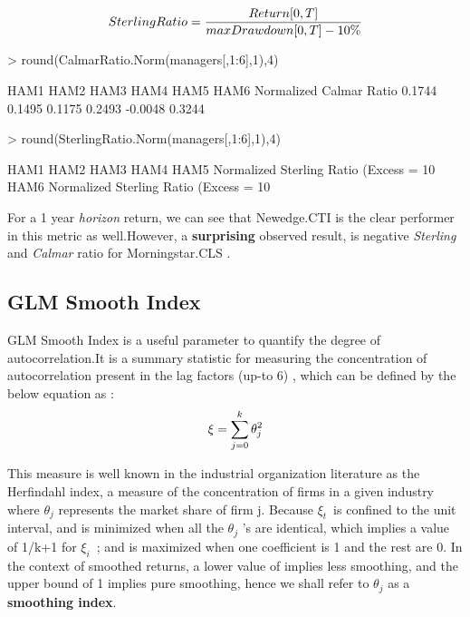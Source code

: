 \documentclass[12pt,letterpaper,english]{article}
\begin{document}
\begin{equation}
 Sterling Ratio  =  \frac{Return [0,T]}{max Drawdown  [0,T] - 10\%} \\
\end{equation}
\begin{Schunk}
\begin{Sinput}
> round(CalmarRatio.Norm(managers[,1:6],1),4)
\end{Sinput}
\begin{Soutput}
                          HAM1   HAM2   HAM3   HAM4    HAM5   HAM6
Normalized Calmar Ratio 0.1744 0.1495 0.1175 0.2493 -0.0048 0.3244
\end{Soutput}
\begin{Sinput}
> round(SterlingRatio.Norm(managers[,1:6],1),4)
\end{Sinput}
\begin{Soutput}
                                           HAM1   HAM2   HAM3  HAM4    HAM5
Normalized Sterling Ratio (Excess = 10%
                                           HAM6
Normalized Sterling Ratio (Excess = 10%
\end{Soutput}
\end{Schunk}
For a 1 year \emph{horizon} return, we can see that Newedge.CTI is the clear performer in this metric as well.However, a \textbf{surprising} observed result, is negative \emph{Sterling} and \emph{Calmar} ratio for Morningstar.CLS . 
\subsection{GLM Smooth Index}
GLM Smooth Index is a useful parameter to quantify the degree of autocorrelation.It is a summary statistic for measuring the concentration of autocorrelation present in the lag factors (up-to 6) , which can be defined by the below equation as :
\begin{equation}
\xi =   \sum_{j=0}^{k} \theta _j^2 \\
\end{equation}

This measure is well known in the industrial organization literature as the Herfindahl index, a measure of the concentration of firms in a given industry where $\theta$\(_j\) represents the market share of firm j. Because $\xi_t$\ is confined to the unit interval, and is minimized when all the $\theta$\(_j\) 's are identical, which implies a value of 1/k+1 for $\xi_i$\ ; and is maximized when one coefficient is 1 and the rest are 0. In the context of smoothed returns, a lower value of implies less smoothing, and the upper bound of 1 implies pure smoothing, hence we shall refer to $\theta$\(_j\) as a \textbf{smoothing index}.
\end{document}
